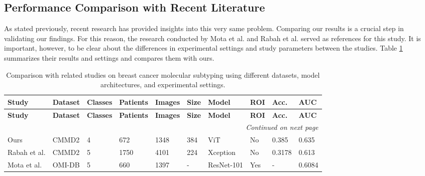 \documentclass[a4paper,10pt]{book}
\begin{document}
\subsection{Performance Comparison with Recent Literature}

As stated previously, recent research has provided insights into this very same problem. Comparing our results is a crucial step in validating our findings. For this reason, the research conducted by Mota et al. \cite{mota_breast_2024} and Rabah et al. \cite{ben_rabah_multimodal_2025} served as references for this study. It is important, however, to be clear about the differences in experimental settings and study parameters between the studies. Table \ref{tab:studies_comparison} summarizes their results and settings and compares them with ours.

\begin{scriptsize}
\begin{longtable}{@{}l l l l l l l l l l@{}}
\caption[Comparison with related studies]{Comparison with related studies on breast cancer molecular subtyping using different datasets, model architectures, and experimental settings.}
\label{tab:studies_comparison} \\
\toprule
\textbf{Study} & \textbf{Dataset} & \textbf{Classes} & \textbf{Patients} & \textbf{Images} &  \textbf{Size} & \textbf{Model}  & \textbf{ROI} & \textbf{Acc.}  & \textbf{AUC}\\
\midrule
\endfirsthead

\toprule
\textbf{Study} & \textbf{Dataset} & \textbf{Classes} & \textbf{Patients} & \textbf{Images} & \textbf{Size} &  \textbf{Model} & \textbf{ROI} & \textbf{Acc.}  & \textbf{AUC}\\
\midrule
\endhead

\midrule
\multicolumn{10}{r}{\textit{Continued on next page}}\\
\midrule
\endfoot

\bottomrule
\endlastfoot
        Ours & CMMD2 & 4  & 672 & 1348 & 384 &  ViT & No & 0.385 & 0.635 \\
        Rabah et al. \cite{ben_rabah_multimodal_2025} & CMMD2 & 5 & 1750  & 4101  & 224 & Xception & No & 0.3178 & 0.613 \\
        Mota et al. \cite{mota_breast_2024} & OMI-DB & 5  & 660 & 1397 & - & ResNet-101 & Yes & - & 0.6084 \\
\end{longtable}
\end{scriptsize}
\end{document}
